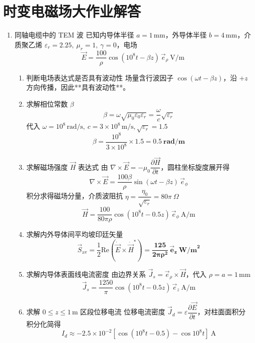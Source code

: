 \section{时变电磁场大作业解答}
\begin{enumerate}[label=\arabic*.]

\item 同轴电缆中的 TEM 波
已知内导体半径 \(a=1\,\text{mm}\)，外导体半径 \(b=4\,\text{mm}\)，介质聚乙烯 \(\varepsilon_r=2.25,\ \mu_r=1,\ \gamma=0\)，电场
\[
\vec{E} = \frac{100}{\rho}\cos(10^8 t - \beta z)\,\vec{e}_\rho\ \text{V/m}
\]
\begin{enumerate}[label=(\arabic*)]
    \item 判断电场表达式是否具有波动性
    场量含行波因子 \(\cos(\omega t-\beta z)\)，沿 \(+z\) 方向传播，因此**具有波动性**。

    \item 求解相位常数 \(\beta\)
    \[
    \beta = \omega\sqrt{\mu_0\varepsilon_0\varepsilon_r} = \frac{\omega}{c}\sqrt{\varepsilon_r}
    \]
    代入 \(\omega=10^8\,\text{rad/s},\ c=3\times 10^8\,\text{m/s},\sqrt{\varepsilon_r}=1.5\)
    \[
    \beta = \frac{10^8}{3\times 10^8}\times 1.5 = \boldsymbol{0.5\ \text{rad/m}}
    \]

    \item 求解磁场强度 \(\vec{H}\) 表达式
    由 \(\nabla\times\vec{E}=-\mu_0\dfrac{\partial\vec{H}}{\partial t}\)，圆柱坐标旋度展开得
    \[
    \nabla\times\vec{E} = \frac{100\beta}{\rho}\sin(\omega t-\beta z)\,\vec{e}_\phi
    \]
    积分求得磁场分量，介质波阻抗 \(\eta=\dfrac{\eta_0}{\sqrt{\varepsilon_r}}=80\pi\ \Omega\)
    \[
    \vec{H} = \frac{100}{80\pi\rho}\cos\left(10^8 t-0.5 z\right)\,\vec{e}_\phi\ \text{A/m}
    \]

    \item 求解内外导体间平均坡印廷矢量
    \[
    \vec{S}_{\text{av}} = \frac{1}{2}\text{Re}\left(\dot{\vec{E}}\times\dot{\vec{H}}^*\right)
    = \boldsymbol{\frac{125}{2\pi\rho^2}\,\vec{e}_z\ \text{W/m}^2}
    \]

    \item 求解内导体表面线电流密度
    由边界关系 \(\vec{J}_s=\vec{e}_\rho\times\vec{H}\)，代入 \(\rho=a=1\,\text{mm}\)
    \[
    \vec{J}_s = \frac{1250}{\pi}\cos\left(10^8 t-0.5 z\right)\,\vec{e}_z\ \text{A/m}
    \]

    \item 求解 \(0\le z\le 1\,\text{m}\) 区段位移电流
    位移电流密度 \(\vec{J}_d=\varepsilon\dfrac{\partial\vec{E}}{\partial t}\)，对柱面面积分积分化简得
    \[
    I_d \approx -2.5\times 10^{-2}\left[\cos(10^8 t-0.5)-\cos10^8 t\right]\ \text{A}
    \]
\end{enumerate}
\vspace{1em}


\end{enumerate}
